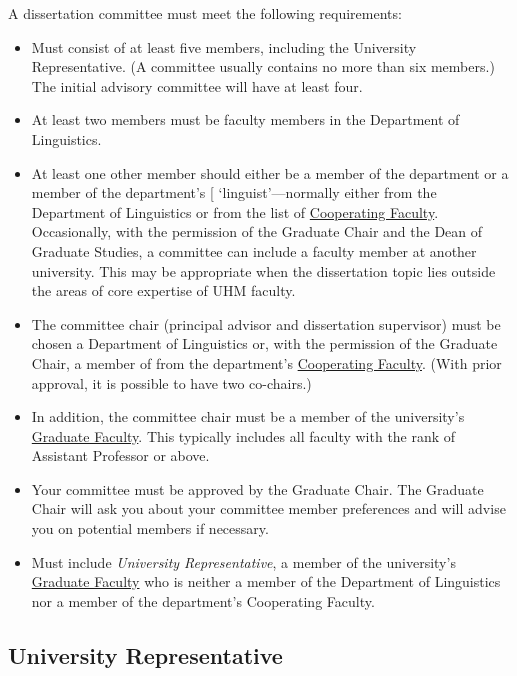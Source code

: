 \documentclass[
]{book}
\providecommand{\tightlist}{%
  \setlength{\itemsep}{0pt}\setlength{\parskip}{0pt}}
\begin{document}
A dissertation committee must meet the following requirements:

\begin{itemize}
\tightlist
\item
  Must consist of at least five members, including the University Representative. (A committee usually contains no more than six members.) The initial advisory committee will have at least four.
\item
  At least two members must be faculty members in the Department of Linguistics.
\item
  At least one other member should either be a member of the department or a member of the department's {[} `linguist'---normally either from the Department of Linguistics or from the list of \href{http://manoa.hawaii.edu/linguistics/people/}{Cooperating Faculty}. Occasionally, with the permission of the Graduate Chair and the Dean of Graduate Studies, a committee can include a faculty member at another university. This may be appropriate when the dissertation topic lies outside the areas of core expertise of UHM faculty.\\
\item
  The committee chair (principal advisor and dissertation supervisor) must be chosen a Department of Linguistics or, with the permission of the Graduate Chair, a member of from the department's \href{http://manoa.hawaii.edu/linguistics/people/}{Cooperating Faculty}. (With prior approval, it is possible to have two co-chairs.)
\item
  In addition, the committee chair must be a member of the university's \href{http://manoa.hawaii.edu/graduate/content/select-committee-member}{Graduate Faculty}. This typically includes all faculty with the rank of Assistant Professor or above.
\item
  Your committee must be approved by the Graduate Chair. The Graduate Chair will ask you about your committee member preferences and will advise you on potential members if necessary.
\item
  Must include \emph{University Representative}, a member of the university's \href{http://manoa.hawaii.edu/graduate/content/select-committee-member}{Graduate Faculty} who is neither a member of the Department of Linguistics nor a member of the department's Cooperating Faculty.
\end{itemize}

\subsection*{University Representative}\label{university-representative}
\end{document}

